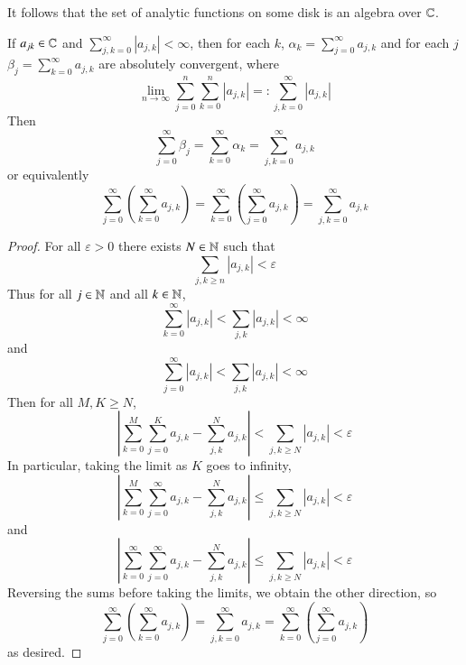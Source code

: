 It follows that the set of analytic functions on some disk is an algebra over $\mathbb C$.

\begin{proposition}\label{prop:3.3.6}
    If $a_{jk} \in \mathbb C$ and $\sum_{j,k=0}^{\infty}|a_{j,k}| < \infty$, then for each $k$, $\alpha_k = \sum_{j=0}^{\infty}a_{j,k}$ and for each $j$ $\beta_j = \sum_{k=0}^{\infty}a_{j,k}$ are absolutely convergent, where \begin{equation*}
        \lim\limits_{n\rightarrow \infty}\sum_{j=0}^n\sum_{k=0}^n|a_{j,k}| =: \sum_{j,k=0}^{\infty}|a_{j,k}|
    \end{equation*}
    Then \begin{equation*}
        \sum_{j=0}^{\infty}\beta_j = \sum_{k=0}^{\infty}\alpha_k = \sum_{j,k=0}^{\infty}a_{j,k}
    \end{equation*}
    or equivalently \begin{equation*}
        \sum_{j=0}^{\infty}\left(\sum_{k=0}^{\infty}a_{j,k}\right)= \sum_{k=0}^{\infty}\left(\sum_{j=0}^{\infty}a_{j,k}\right) = \sum_{j,k=0}^{\infty}a_{j,k}
    \end{equation*}
\end{proposition}
\begin{proof}
    For all $\varepsilon > 0$ there exists $N \in \mathbb N$ such that $$\sum_{j,k\geq n}|a_{j,k}| < \varepsilon$$ Thus for all $j \in \mathbb N$ and all $k \in \mathbb N$, $$\sum_{k=0}^{\infty}|a_{j,k}| < \sum_{j,k}|a_{j,k}| < \infty$$ and $$\sum_{j=0}^{\infty}|a_{j,k}| < \sum_{j,k}|a_{j,k}| <\infty$$ Then for all $M,K \geq N$, $$\left|\sum_{k=0}^M\sum_{j=0}^Ka_{j,k} - \sum_{j,k}^Na_{j,k}\right| < \sum_{j,k \geq N}|a_{j,k}| < \varepsilon$$ In particular, taking the limit as $K$ goes to infinity, $$\left|\sum_{k=0}^M\sum_{j=0}^{\infty}a_{j,k} - \sum_{j,k}^Na_{j,k}\right| \leq \sum_{j,k \geq N}|a_{j,k}| < \varepsilon$$
    and $$\left|\sum_{k=0}^{\infty}\sum_{j=0}^{\infty}a_{j,k} - \sum_{j,k}^Na_{j,k}\right| \leq \sum_{j,k \geq N}|a_{j,k}| < \varepsilon$$
    Reversing the sums before taking the limits, we obtain the other direction, so \begin{equation*}
        \sum_{j=0}^{\infty}\left(\sum_{k=0}^{\infty}a_{j,k}\right) = \sum_{j,k=0}^{\infty}a_{j,k} = \sum_{k=0}^{\infty}\left(\sum_{j=0}^{\infty}a_{j,k}\right)
    \end{equation*}
    as desired.
\end{proof}


